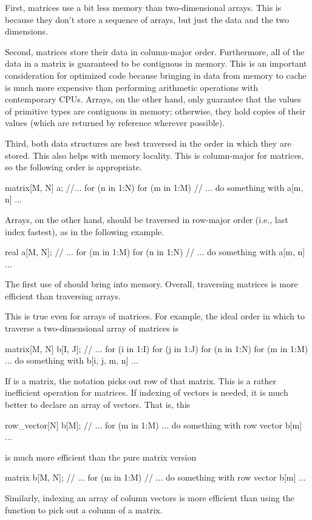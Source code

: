 First, matrices use a bit less memory than two-dimensional arrays.
This is because they don't store a sequence of arrays, but just the
data and the two dimensions.

Second, matrices store their data in column-major order.  Furthermore,
all of the data in a matrix is guaranteed to be contiguous in memory.
This is an important consideration for optimized code because bringing
in data from memory to cache is much more expensive than performing
arithmetic operations with contemporary CPUs.  Arrays, on the other
hand, only guarantee that the values of primitive types are contiguous
in memory; otherwise, they hold copies of their values (which are
returned by reference wherever possible).

Third, both data structures are best traversed in the order in which
they are stored.  This also helps with memory locality.  This is
column-major for matrices, so the following order is appropriate.
%
\begin{stancode}
matrix[M, N] a;
//...
for (n in 1:N)
  for (m in 1:M)
    // ... do something with a[m, n] ...
\end{stancode}
%
Arrays, on the other hand, should be traversed in row-major order
(i.e., last index fastest), as in the following example.
%
\begin{stancode}
real a[M, N];
// ...
for (m in 1:M)
  for (n in 1:N)
    // ... do something with a[m, n] ...
\end{stancode}
%
The first use of  should bring  into memory.
Overall, traversing matrices is more efficient than traversing arrays.

This is true even for arrays of matrices.  For example, the ideal
order in which to traverse a two-dimensional array of matrices is
%
\begin{stancode}
matrix[M, N] b[I, J];
// ...
for (i in 1:I)
  for (j in 1:J)
    for (n in 1:N)
      for (m in 1:M)
        ... do something with b[i, j, m, n] ...
\end{stancode}

If  is a matrix, the notation  picks out row
 of that matrix.  This is a rather inefficient operation for
matrices.  If indexing of vectors is needed, it is much better to
declare an array of vectors.  That is, this
%
\begin{stancode}
row_vector[N] b[M];
// ...
for (m in 1:M)
   ... do something with row vector b[m] ...
\end{stancode}
%
is much more efficient than the pure matrix version
%
\begin{stancode}
matrix b[M, N];
// ...
for (m in 1:M)
   // ... do something with row vector b[m] ...
\end{stancode}
%
Similarly, indexing an array of column vectors is more efficient than
using the  function to pick out a column of a matrix.

